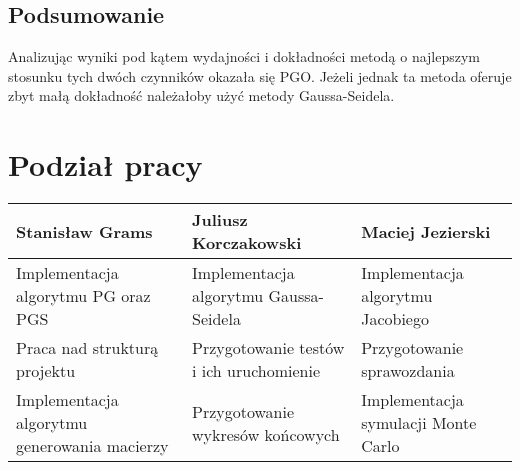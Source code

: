 \documentclass[10pt]{article}
\begin{document}
\subsection{Podsumowanie}
\begin{wniosek}
	Analizując wyniki pod kątem wydajności i dokładności metodą o najlepszym stosunku tych dwóch czynników okazała się PGO. Jeżeli jednak ta metoda oferuje zbyt małą dokładność należałoby użyć metody Gaussa-Seidela.
\end{wniosek}
\section{Podział pracy}
\centering
	\begin{tabular}{| p{5cm} | p{5cm} | p{5cm} |}
		\hline
		\textbf{Stanisław Grams} & \textbf{Juliusz Korczakowski} & \textbf{Maciej Jezierski} \\ \hline
		Implementacja algorytmu PG oraz PGS & Implementacja algorytmu Gaussa-Seidela & Implementacja algorytmu Jacobiego \\ \hline
		Praca nad strukturą projektu & Przygotowanie testów i ich uruchomienie & Przygotowanie sprawozdania \\ \hline
		Implementacja algorytmu generowania macierzy & Przygotowanie wykresów końcowych &Implementacja symulacji Monte Carlo\\ \hline
		
		
		
	\end{tabular}
\end{document}
